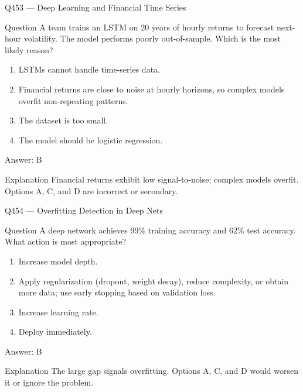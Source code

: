 \documentclass[aspectratio=169,8pt]{beamer}
\begin{document}
	\begin{frame}{Q453 --- Deep Learning and Financial Time Series}
		\begin{block}{Question}
			A team trains an LSTM on 20 years of hourly returns to forecast next-hour volatility. The model performs poorly out-of-sample. Which is the most likely reason?
			\begin{enumerate}
				\item LSTMs cannot handle time-series data.
				\item Financial returns are close to noise at hourly horizons, so complex models overfit non-repeating patterns.
				\item The dataset is too small.
				\item The model should be logistic regression.
			\end{enumerate}
		\end{block}
		\begin{exampleblock}{Answer: B}\end{exampleblock}
		\begin{block}{Explanation}
			Financial returns exhibit low signal-to-noise; complex models overfit. Options A, C, and D are incorrect or secondary.
		\end{block}
	\end{frame}
	
	\begin{frame}{Q454 --- Overfitting Detection in Deep Nets}
		\begin{block}{Question}
			A deep network achieves 99\% training accuracy and 62\% test accuracy. What action is most appropriate?
			\begin{enumerate}
				\item Increase model depth.
				\item Apply regularization (dropout, weight decay), reduce complexity, or obtain more data; use early stopping based on validation loss.
				\item Increase learning rate.
				\item Deploy immediately.
			\end{enumerate}
		\end{block}
		\begin{exampleblock}{Answer: B}\end{exampleblock}
		\begin{block}{Explanation}
			The large gap signals overfitting. Options A, C, and D would worsen it or ignore the problem.
		\end{block}
	\end{frame}
	
\end{document}
